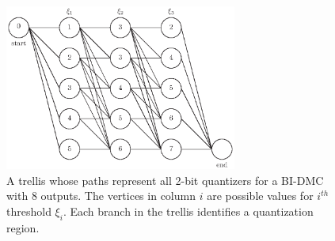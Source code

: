\documentclass [PhD] {uclathes}
\begin{document}
\begin{figure}
	\centering
	\includegraphics[width=18pc]{figures/trellis.eps}
	\caption{A trellis whose paths represent all 2-bit quantizers for a BI-DMC with 8 outputs. The vertices in column $i$ are possible values for $i^{th}$ threshold $\xi_i$. Each branch in the trellis identifies a quantization region.
	}
	\label{fig: trellis}
\end{figure}
\end{document}

